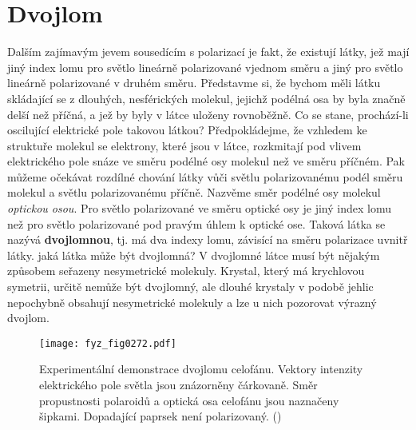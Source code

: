   \section{Dvojlom}\label{fyz:IchapXXXIIIsecIII}
    Dalším zajímavým jevem sousedícím s polarizací je fakt, že existují látky, jež mají jiný index
    lomu pro světlo lineárně polarizované vjednom směru a jiný pro světlo lineárně polarizované v
    druhém směru. Představme si, že bychom měli látku skládající se z dlouhých, nesférických
    molekul, jejichž podélná osa by byla značně delší než příčná, a jež by byly v látce uloženy
    rovnoběžně. Co se stane, prochází-li oscilující elektrické pole takovou látkou? Předpokládejme,
    že vzhledem ke struktuře molekul se elektrony, které jsou v látce, rozkmitají pod vlivem
    elektrického pole snáze ve směru podélné osy molekul než ve směru příčném. Pak můžeme očekávat
    rozdílné chování látky vůči světlu polarizovanému podél směru molekul a světlu polarizovanému
    příčně. Nazvěme směr podélné osy molekul \emph{optickou osou}. Pro světlo polarizované ve směru
    optické osy je jiný index lomu než pro světlo polarizované pod pravým úhlem k optické ose.
    Taková látka se nazývá \textbf{dvojlomnou}, tj. má dva indexy lomu, závisící na směru polarizace
    uvnitř látky. jaká látka může být dvojlomná? V dvojlomné látce musí být nějakým způsobem
    seřazeny nesymetrické molekuly. Krystal, který má krychlovou symetrii, určitě nemůže být
    dvojlomný, ale dlouhé krystaly v podobě jehlic nepochybně obsahují nesymetrické molekuly a lze u
    nich pozorovat výrazný dvojlom.

    \begin{figure}[ht!] %
      \centering
      \texttt{[image: fyz\_fig0272.pdf]}
      \caption{Experimentální demonstrace dvojlomu celofánu. Vektory intenzity elektrického pole
               světla jsou znázorněny čárkovaně. Směr propustnosti polaroidů a optická osa celofánu
               jsou naznačeny šipkami. Dopadající paprsek není polarizovaný.
               (\cite[s.~427]{Feynman01})}
      \label{fyz:fig0272}
    \end{figure}

